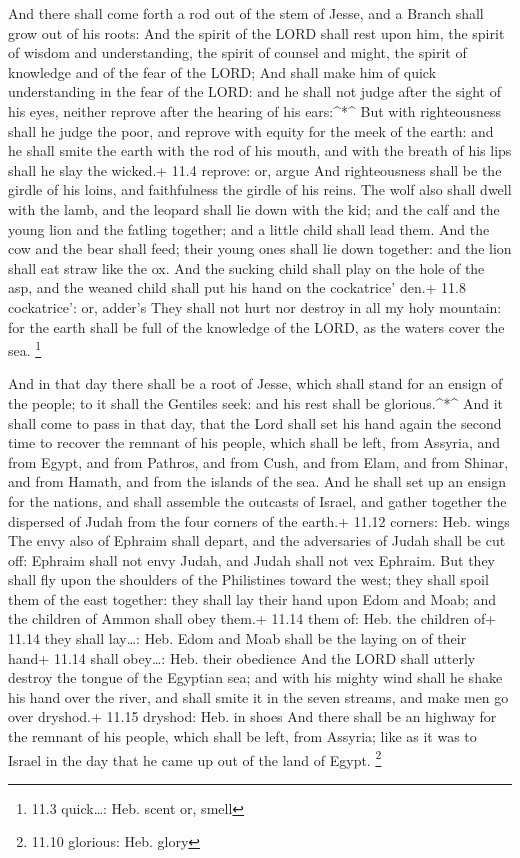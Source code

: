  And there shall come forth a rod out of the stem of Jesse,
and a Branch shall grow out of his roots:  And the spirit of
the LORD shall rest upon him, the spirit of wisdom and understanding,
the spirit of counsel and might, the spirit of knowledge and of the fear
of the LORD;  And shall make him of quick understanding in
the fear of the LORD: and he shall not judge after the sight of his
eyes, neither reprove after the hearing of his ears:\^{}*\^{}
 But with righteousness shall he judge the poor, and reprove
with equity for the meek of the earth: and he shall smite the earth with
the rod of his mouth, and with the breath of his lips shall he slay the
wicked.+ 11.4 reprove: or, argue  And righteousness shall be
the girdle of his loins, and faithfulness the girdle of his reins.
 The wolf also shall dwell with the lamb, and the leopard
shall lie down with the kid; and the calf and the young lion and the
fatling together; and a little child shall lead them.  And
the cow and the bear shall feed; their young ones shall lie down
together: and the lion shall eat straw like the ox.  And the
sucking child shall play on the hole of the asp, and the weaned child
shall put his hand on the cockatrice' den.+ 11.8 cockatrice': or,
adder's  They shall not hurt nor destroy in all my holy
mountain: for the earth shall be full of the knowledge of the LORD, as
the waters cover the sea. \footnote{11.3 quick\ldots: Heb. scent or,
  smell}

 And in that day there shall be a root of Jesse, which
shall stand for an ensign of the people; to it shall the Gentiles seek:
and his rest shall be glorious.\^{}*\^{}  And it shall come
to pass in that day, that the Lord shall set his hand again the second
time to recover the remnant of his people, which shall be left, from
Assyria, and from Egypt, and from Pathros, and from Cush, and from Elam,
and from Shinar, and from Hamath, and from the islands of the sea.
 And he shall set up an ensign for the nations, and shall
assemble the outcasts of Israel, and gather together the dispersed of
Judah from the four corners of the earth.+ 11.12 corners: Heb. wings
 The envy also of Ephraim shall depart, and the adversaries
of Judah shall be cut off: Ephraim shall not envy Judah, and Judah shall
not vex Ephraim.  But they shall fly upon the shoulders of
the Philistines toward the west; they shall spoil them of the east
together: they shall lay their hand upon Edom and Moab; and the children
of Ammon shall obey them.+ 11.14 them of: Heb. the children of+ 11.14
they shall lay\ldots: Heb. Edom and Moab shall be the laying on of their
hand+ 11.14 shall obey\ldots: Heb. their obedience  And the
LORD shall utterly destroy the tongue of the Egyptian sea; and with his
mighty wind shall he shake his hand over the river, and shall smite it
in the seven streams, and make men go over dryshod.+ 11.15 dryshod: Heb.
in shoes  And there shall be an highway for the remnant of
his people, which shall be left, from Assyria; like as it was to Israel
in the day that he came up out of the land of Egypt. \footnote{11.10
  glorious: Heb. glory}

